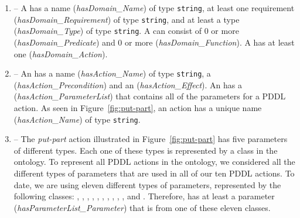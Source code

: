 %
%
\begin{enumerate}
\item {} -- A  has a name (\emph{hasDomain\_Name}) of type 
\texttt{string}, at least one requirement (\emph{hasDomain\_Requirement}) of type 
\texttt{string}, and at least a type (\emph{hasDomain\_Type}) of type \texttt{string}. 
A  can consist of 0 or more  (\emph{hasDomain\_Predicate}) 
and 0 or more  (\emph{hasDomain\_Function}). A  has 
at least one  (\emph{hasDomain\_Action}).
\item {} -- An  has a name (\emph{hasAction\_Name}) of 
type \texttt{string}, a  (\emph{hasAction\_Precondition}) and 
an  (\emph{hasAction\_Effect}). An  has a 
 (\emph{hasAction\_ParameterList}) that contains all of the 
parameters for a PDDL action. As seen in Figure~\ref{fig:put-part}, an action 
has a unique name (\emph{hasAction\_Name}) of type \texttt{string}.
\item {} -- The \textsl{put-part} action illustrated in 
Figure~\ref{fig:put-part} has five parameters of different types. Each one of 
these types is represented by a class in the  ontology. To represent 
all PDDL actions in the  ontology, we considered all the different types 
of parameters that are used in all of our ten PDDL actions. To date, we are using eleven 
different types of parameters, represented by the following classes: 
, , , , 
, , , 
, , , and . 
Therefore,  has at least a parameter 
(\emph{hasParameterList\_Parameter}) that is from one of these eleven classes.


\end{enumerate}
